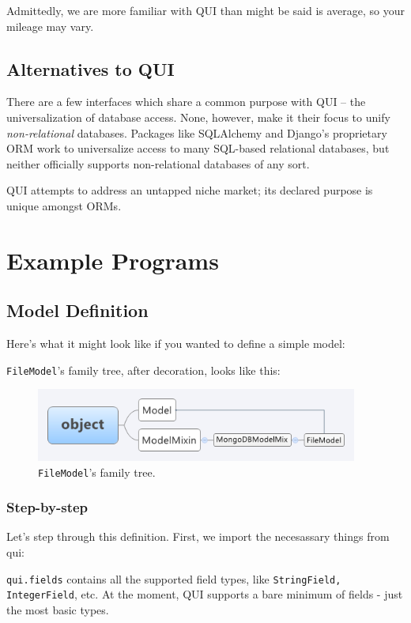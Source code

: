 \documentclass{article} %
\newenvironment{inset}
{
\begin{center}
\begin{minipage}{0.85\textwidth}
}
{
\end{minipage}
\end{center}
}
\newcommand{\il}[1]{\mbox{\lstinline{#1}}}
\newcommand{\lstslice}[3]{
\begin{inset}

\end{inset}
}
\begin{document}
Admittedly, we are more familiar with QUI than might be said is average, so your mileage may vary.

\subsection{Alternatives to QUI}
There are a few interfaces which share a common purpose with QUI -- the universalization of database access. None, however,
make it their focus to unify \emph{non-relational} databases. Packages like SQLAlchemy and Django's proprietary ORM work to
universalize access to many SQL-based relational databases, but neither officially supports non-relational databases of any sort.

QUI attempts to address an untapped niche market; its declared purpose is unique amongst ORMs.
\newpage
\section{Example Programs}
\label{examples}
\subsection{Model Definition}
Here's what it might look like if you wanted to define a simple model:

\il{FileModel}'s family tree, after decoration, looks like this:
\begin{figure}[htb]
\centering
\includegraphics[width=400px]{FileModelInheritanceTree}
\caption{\il{FileModel}'s family tree.}
\end{figure}

\subsubsection{Step-by-step}
Let's step through this definition. First, we import the necesassary things from qui:
\lstslice{1}{4}{model_definitions.py}
\il{qui.fields} contains all the supported field types, like \il{StringField, IntegerField}, etc. At the moment, QUI supports 
a bare minimum of fields - just the most basic types.
\end{document}
